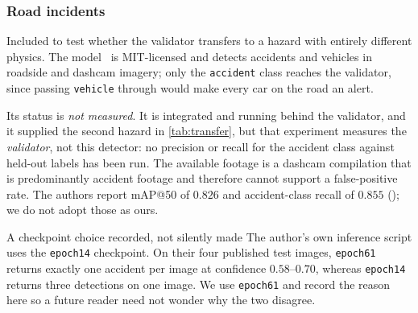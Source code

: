 \subsubsection{Road incidents}
\label{sec:traffic}

Included to test whether the validator transfers to a hazard with entirely
different physics. The model~\citep{enostraffic} is MIT-licensed and detects
accidents and vehicles in roadside and dashcam imagery; only the
\texttt{accident} class reaches the validator, since passing \texttt{vehicle}
through would make every car on the road an alert.

Its status is \emph{not measured}. It is integrated and running behind the
validator, and it supplied the second hazard in \cref{tab:transfer}, but that
experiment measures the \emph{validator}, not this detector: no precision or
recall for the accident class against held-out labels has been run. The
available footage is a dashcam compilation that is predominantly accident
footage and therefore cannot support a false-positive rate. The authors report
mAP@50 of $0.826$ and accident-class recall of $0.855$ (\reported{}); we do
not adopt those as ours.

\begin{recorded}{A checkpoint choice recorded, not silently made}
The author's own inference script uses the \texttt{epoch14} checkpoint. On
their four published test images, \texttt{epoch61} returns exactly one
accident per image at confidence $0.58$--$0.70$, whereas \texttt{epoch14}
returns three detections on one image. We use \texttt{epoch61} and record the
reason here so a future reader need not wonder why the two
disagree.
\end{recorded}
